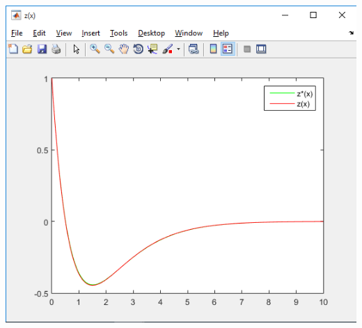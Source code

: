 \documentclass[]{article}
\begin{document}
\begin{enumerate}
\begin{center}
	\includegraphics[scale=0.85]{z1.png}
\end{center}


\end{enumerate}
\end{document}
